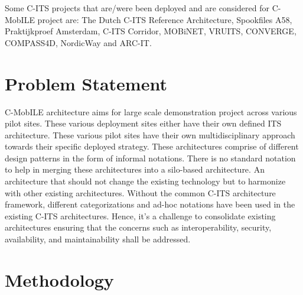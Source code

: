 \documentclass[conference]{IEEEtran}
\begin{document}
Some C-ITS projects that are/were been deployed and are considered for C-MobILE project are: The Dutch C-ITS Reference Architecture\cite{ditcm}, Spookfiles A58\cite{shockwave}, Praktijkproef Amsterdam\cite{praktijkproefams}, C-ITS Corridor\cite{corridor}, MOBiNET\cite{mobinet}, VRUITS\cite{vruits}, CONVERGE\cite{converge}, COMPASS4D\cite{compass4d}, NordicWay\cite{nordicway} and ARC-IT\cite{arcit}.

\section{Problem Statement}

C-MobILE architecture aims for large scale demonstration project across various pilot sites. These various deployment sites either have their own defined ITS architecture. These various pilot sites have their own multidisciplinary approach towards their specific deployed strategy. These architectures comprise of different design patterns in the form of informal notations. There is no standard notation to help in merging these architectures into a silo-based architecture. An architecture that should not change the existing technology but to harmonize with other existing architectures. Without the common C-ITS architecture framework, different categorizations and ad-hoc notations have been used in the existing C-ITS architectures. Hence, it's a challenge to consolidate existing architectures ensuring that the concerns such as interoperability, security, availability, and maintainability shall be addressed. 

\section{Methodology}
\end{document}
